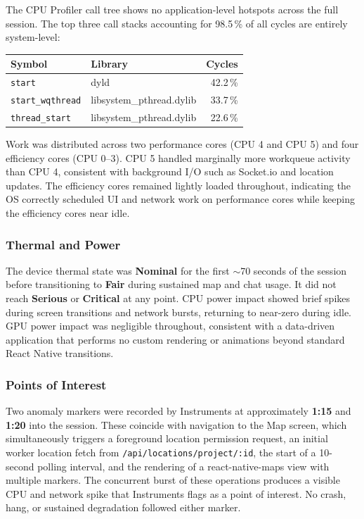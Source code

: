 \documentclass[12pt,a4paper]{article}
\begin{document}
The CPU Profiler call tree shows no application-level hotspots across the full session. The top three call stacks accounting for 98.5\,\% of all cycles are entirely system-level:

\begin{tabular}{llr}
\toprule
\textbf{Symbol} & \textbf{Library} & \textbf{Cycles} \\
\midrule
\texttt{start}           & dyld                    & 42.2\,\% \\
\texttt{start\_wqthread} & libsystem\_pthread.dylib & 33.7\,\% \\
\texttt{thread\_start}   & libsystem\_pthread.dylib & 22.6\,\% \\
\bottomrule
\end{tabular}

\vspace{8pt}

Work was distributed across two performance cores (CPU 4 and CPU 5) and four efficiency cores (CPU 0--3). CPU 5 handled marginally more workqueue activity than CPU 4, consistent with background I/O such as Socket.io and location updates. The efficiency cores remained lightly loaded throughout, indicating the OS correctly scheduled UI and network work on performance cores while keeping the efficiency cores near idle.

\subsubsection{Thermal and Power}

The device thermal state was \textbf{Nominal} for the first $\sim$70 seconds of the session before transitioning to \textbf{Fair} during sustained map and chat usage. It did not reach \textbf{Serious} or \textbf{Critical} at any point. CPU power impact showed brief spikes during screen transitions and network bursts, returning to near-zero during idle. GPU power impact was negligible throughout, consistent with a data-driven application that performs no custom rendering or animations beyond standard React Native transitions.

\subsubsection{Points of Interest}

Two anomaly markers were recorded by Instruments at approximately \textbf{1:15} and \textbf{1:20} into the session. These coincide with navigation to the Map screen, which simultaneously triggers a foreground location permission request, an initial worker location fetch from \texttt{/api/locations/project/:id}, the start of a 10-second polling interval, and the rendering of a react-native-maps view with multiple markers. The concurrent burst of these operations produces a visible CPU and network spike that Instruments flags as a point of interest. No crash, hang, or sustained degradation followed either marker.
\end{document}
